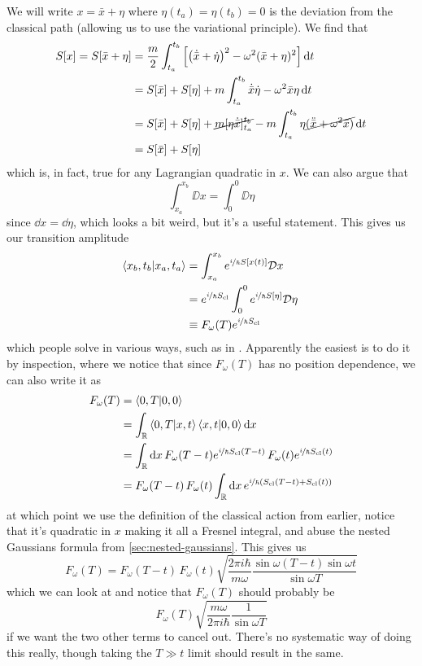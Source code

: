 \documentclass[]{revision-notes}
\begin{document}
We will write \( x = \bar{x} + \eta \) where \(\eta(t_a) = \eta(t_b) = 0\) is the deviation from the classical path (allowing us to use the variational principle).
We find that
\begin{align*}
  S[x] = S[\bar{x} + \eta] &= \frac{m}{2}\int_{t_a}^{t_b} \qty[ \qty(\dot{\bar{x}} + \dot\eta)^2 - \omega^2(\bar{x} + \eta)^2] \dd{t}\\
                    &= S[\bar{x}] + S[\eta] + m\int_{t_a}^{t_b} \dot{\bar{x}}\dot\eta - \omega^2\bar{x}\eta\dd{t}\\
                    &= S[\bar{x}] + S[\eta] + \cancel{m[\eta \dot{\bar{x}}]_{t_a}^{t_b}} - m \int_{t_a}^{t_b}\eta \cancel{(\ddot{\bar{x}} + \omega^2 \bar{x}) }\dd{t}\\
                    &= S[\bar{x}] + S[\eta]
\end{align*}
which is, in fact, true for any Lagrangian quadratic in \(x\).
We can also argue that \[ \int_{x_a}^{x_b} \DD{x} = \int_{0}^{0} \DD{\eta}\] since \(\dd{x} = \dd{\eta} \), which looks a bit weird, but it's a useful statement.
This gives us our transition amplitude
\begin{align*}
  \braket{x_b, t_b}{x_a, t_a} &= \int_{x_a}^{x_b} e^{\nicefrac{i}{\hbar} S[x(t)]} \mathcal{D} x\,\\
  &= e^{\nicefrac{i}{\hbar} S_{\mathrm{cl}}} \int_{0}^{0} e^{\nicefrac{i}{\hbar} S[\eta]} \mathcal{D} \eta\,\\
  &\equiv F_\omega(T)e^{\nicefrac{i}{\hbar} S_{\mathrm{cl}}}
\end{align*}
which people solve in various ways, such as in \cite{feynman2010quantum}. Apparently the easiest is to do it by inspection, where we notice that since \( F_\omega (T) \) has no position dependence, we can also write it as
\begin{align*}
  F_\omega(T) &= \braket{0, T}{0, 0}\\
              &= \int_\mathbb{R} \bra{0,T}\ket{x,t}\bra{x,t}\ket{0,0} \dd{x}\\
              &= \int_\mathbb{R} \dd{x} F_\omega(T - t)e^{\nicefrac{i}{\hbar} S_{\mathrm{cl}}(T-t)}\,F_\omega(t)e^{\nicefrac{i}{\hbar} S_{\mathrm{cl}}(t)}\\
              &= F_\omega(T - t)\, F_\omega(t) \int_\mathbb{R} \dd{x} e^{\nicefrac{i}{\hbar} (S_{\mathrm{cl}}(T-t) + S_{\mathrm{cl}}(t))}
\end{align*}
at which point we use the definition of the classical action from earlier, notice that it's quadratic in \(x \) making it all a Fresnel integral, and abuse the nested Gaussians formula from \autoref{sec:nested-gaussians}.
This gives us
\begin{equation*}
  F_\omega(T) = F_\omega(T - t)\, F_\omega(t) \sqrt{\frac{2\pi i \hbar}{m\omega} \frac{\sin\omega(T-t) \sin\omega t}{\sin \omega T}}
\end{equation*}
which we can look at and notice that \( F_\omega (T) \) should probably be
\[ F_\omega (T) \sqrt{\frac{m\omega}{2\pi i \hbar} \frac{1}{\sin \omega T}} \] if we want the two other terms to cancel out. There's no systematic way of doing this really, though taking the \( T \gg t \) limit should result in the same.
\end{document}
